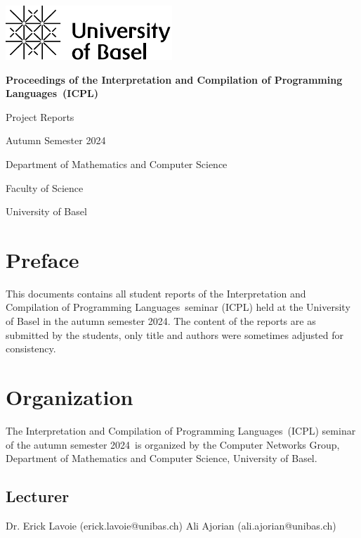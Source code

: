 \documentclass[runningheads,a4paper]{llncs}
\newenvironment{produceProceedings}{}{}
\newcommand{\coursename}{Interpretation and Compilation of Programming Languages}
\newcommand{\courseacronym}{ICPL}
\newcommand{\semester}{autumn semester 2024}
\newcommand{\Semester}{Autumn Semester 2024}
\newcommand{\proceedingsSubtitle}{Project Reports}
\begin{document}
\begin{produceProceedings}

	\begin{titlepage}
		\includegraphics{UniBas_Logo_EN_Schwarz_RGB_65}

		\vspace{80pt}

		\centering

		\begin{spacing}{2.8}
			{\Huge {} \bfseries Proceedings of the \coursename\ (\courseacronym)}
		\end{spacing}

		\vspace{25pt}

		{\large \proceedingsSubtitle}

		\vspace{50pt}

		{\large \Semester}

		\vspace{50pt}

		{\large	Department of Mathematics and Computer Science}

		\vspace{5pt}

		{\large Faculty of Science}

		\vspace{25pt}

		{\large	University of Basel}
	\end{titlepage}


	\pagestyle{headings}
	\chapter*{Preface}
	This documents contains all student reports of the \coursename\ seminar (\courseacronym) held at the University of Basel in the \semester.
	The content of the reports are as submitted by the students, only title and authors were sometimes adjusted for consistency.
	\chapter*{Organization}
	The \coursename\ (\courseacronym) seminar of the \semester\ is organized by the Computer Networks Group, Department of Mathematics and Computer Science, University of Basel.
	\section*{Lecturer}
	Dr. Erick Lavoie (erick.lavoie@unibas.ch)
	Ali Ajorian (ali.ajorian@unibas.ch)
	\tableofcontents
\end{produceProceedings}

%
\mainmatter
%

\end{document}
